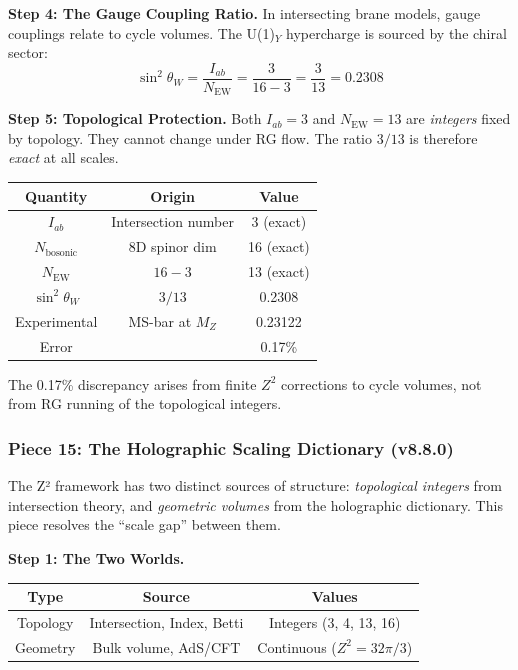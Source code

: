 \documentclass[12pt,a4paper]{article}
\newcommand{\sinW}{\sin^2\theta_W}
\newcommand{\Zsq}{Z^2}
\begin{document}
\textbf{Step 4: The Gauge Coupling Ratio.}
In intersecting brane models, gauge couplings relate to cycle volumes.
The U(1)$_Y$ hypercharge is sourced by the chiral sector:
\begin{equation}
\boxed{
\sinW = \frac{I_{ab}}{N_{\text{EW}}} = \frac{3}{16 - 3} = \frac{3}{13}
= 0.2308
}
\end{equation}

\textbf{Step 5: Topological Protection.}
Both $I_{ab} = 3$ and $N_{\text{EW}} = 13$ are \textit{integers} fixed
by topology. They cannot change under RG flow. The ratio $3/13$ is
therefore \textit{exact} at all scales.

\begin{center}
\begin{tabular}{|c|c|c|}
\hline
\textbf{Quantity} & \textbf{Origin} & \textbf{Value} \\
\hline
$I_{ab}$ & Intersection number & 3 (exact) \\
$N_{\text{bosonic}}$ & 8D spinor dim & 16 (exact) \\
$N_{\text{EW}}$ & $16 - 3$ & 13 (exact) \\
$\sinW$ & $3/13$ & 0.2308 \\
\hline
Experimental & MS-bar at $M_Z$ & 0.23122 \\
Error & & 0.17\% \\
\hline
\end{tabular}
\end{center}

The 0.17\% discrepancy arises from finite $\Zsq$ corrections to cycle
volumes, not from RG running of the topological integers.

\subsubsection{Piece 15: The Holographic Scaling Dictionary (v8.8.0)}

The Z² framework has two distinct sources of structure: \textit{topological
integers} from intersection theory, and \textit{geometric volumes} from the
holographic dictionary. This piece resolves the ``scale gap'' between them.

\textbf{Step 1: The Two Worlds.}

\begin{center}
\begin{tabular}{|c|c|c|}
\hline
\textbf{Type} & \textbf{Source} & \textbf{Values} \\
\hline
Topology & Intersection, Index, Betti & Integers (3, 4, 13, 16) \\
Geometry & Bulk volume, AdS/CFT & Continuous ($\Zsq = 32\pi/3$) \\
\hline
\end{tabular}
\end{center}
\end{document}
